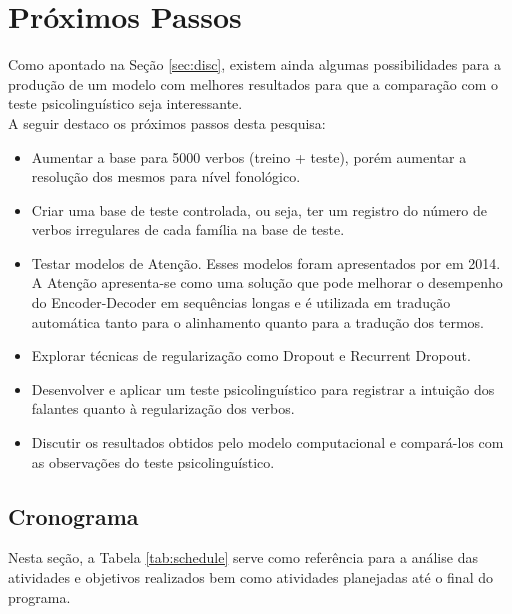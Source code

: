 \chapter{Próximos Passos}
\label{ch04:FutureSteps}


Como apontado na Seção \ref{sec:disc}, existem ainda algumas possibilidades para a produção de um modelo com melhores resultados para que a comparação com o teste psicolinguístico seja interessante.\\

A seguir destaco os próximos passos desta pesquisa:

\begin{itemize}
\item Aumentar a base para 5000 verbos (treino + teste), porém aumentar a resolução dos mesmos para nível fonológico.
\item Criar uma base de teste controlada, ou seja, ter um registro do número de verbos irregulares de cada família na base de teste.
\item Testar modelos de Atenção. Esses modelos foram apresentados por \citeauthor{dimitry:2014} em 2014. A Atenção apresenta-se como uma solução que pode melhorar o desempenho do Encoder-Decoder em sequências longas e é utilizada em tradução automática tanto para o alinhamento quanto para a tradução dos termos.
\item Explorar técnicas de regularização como Dropout e Recurrent Dropout.
\item Desenvolver e aplicar um teste psicolinguístico para registrar a intuição dos falantes quanto à regularização dos verbos.
\item Discutir os resultados obtidos pelo modelo computacional e compará-los com as observações do teste psicolinguístico.

\end{itemize}


\section{Cronograma}
\label{sec:work-plan}

Nesta seção, a Tabela \ref{tab:schedule} serve como referência para a análise das atividades e objetivos realizados bem como atividades planejadas até o final do programa.

